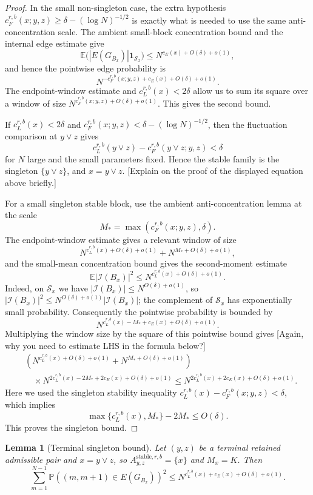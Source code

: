 \documentclass[11pt]{article}
\newtheorem{lem}{Lemma}
\newcommand{\cI}{\mathcal I}
\newcommand{\E}{\mathbb E}
\newcommand{\Pbb}{\mathbb P}
\newcommand{\stable}{\mathrm{stable}}
\newcommand{\jscomment}[1]{\textup{\textsf{\color{blue}[#1]}}}
\begin{document}
\begin{proof}
In the small non-singleton case, the extra hypothesis
\(c_F^{r,b}(x;y,z)\ge\delta-(\log N)^{-1/2}\) is exactly what is needed
to use the same anti-concentration scale. The ambient small-block
concentration bound and the internal edge estimate give
\[
    \E\bigl(|E(G_{B_x})|\mathbf 1_{\mathcal S_x}\bigr)
    \le N^{c_E(x)+O(\delta)+o(1)},
\]
and hence the pointwise edge probability is
\[
    N^{-c_F^{r,b}(x;y,z)+c_E(x)+O(\delta)+o(1)}.
\]
The endpoint-window estimate and \(c_L^{r,b}(x)<2\delta\) allow us to
sum its square over a window of size
\(N^{c_F^{r,b}(x;y,z)+O(\delta)+o(1)}\). This gives the second bound.

If \(c_L^{r,b}(x)<2\delta\) and
\(c_F^{r,b}(x;y,z)<\delta-(\log N)^{-1/2}\), then the fluctuation
comparison at \(y\vee z\) gives
\[
    c_L^{r,b}(y\vee z)-c_F^{r,b}(y\vee z;y,z)<\delta
\]
for \(N\) large and the small parameters fixed. Hence the stable family
is the singleton \(\{y\vee z\}\), and \(x=y\vee z\).
\jscomment{Explain on the proof of the displayed equation above briefly.}

For a small singleton stable block, use the ambient anti-concentration
lemma at the scale
\[
    M_*=\max(c_F^{r,b}(x;y,z),\delta).
\]
The endpoint-window estimate gives a relevant window of size
\[
    N^{c_L^{r,b}(x)+O(\delta)+o(1)}
    +
    N^{M_*+O(\delta)+o(1)} ,
\]
and the small-mean concentration bound gives the second-moment estimate
\[
    \E|\cI(B_x)|^2\le N^{c_L^{r,b}(x)+O(\delta)+o(1)}.
\]
Indeed, on \(\mathcal S_x\) we have
\(|\cI(B_x)|\le N^{O(\delta)+o(1)}\), so
\(|\cI(B_x)|^2\le N^{O(\delta)+o(1)}|\cI(B_x)|\); the complement of
\(\mathcal S_x\) has exponentially small probability.
Consequently the pointwise probability is bounded by
\[
    N^{c_L^{r,b}(x)-M_*+c_E(x)+O(\delta)+o(1)}.
\]
Multiplying the window size by the square of this pointwise bound gives \jscomment{Again, why you need to estimate LHS in the formula below?}
\[
\begin{aligned}
&\left(
N^{c_L^{r,b}(x)+O(\delta)+o(1)}
    +
    N^{M_*+O(\delta)+o(1)}
\right)\\
&\quad \times
N^{2c_L^{r,b}(x)-2M_*+2c_E(x)+O(\delta)+o(1)}
    \le
    N^{2c_L^{r,b}(x)+2c_E(x)+O(\delta)+o(1)}.
\end{aligned}
\]
Here we used the singleton stability inequality
\(c_L^{r,b}(x)-c_F^{r,b}(x;y,z)<\delta\), which implies
\[
    \max\{c_L^{r,b}(x),M_*\}-2M_*
    \le O(\delta).
\]
This proves the singleton bound.
\end{proof}

\begin{lem}[Terminal singleton bound]
Let \((y,z)\) be a terminal retained admissible pair and
\(x=y\vee z\), so \(A_{y,z}^{\stable,r,b}=\{x\}\) and \(M_x=K\). Then
\[
    \sum_{m=1}^{N-1}\Pbb((m,m+1)\in E(G_{B_x}))^2
    \le N^{c_L^{r,b}(x)+c_E(x)+O(\delta)+o(1)} .
\]
\end{lem}
\end{document}
